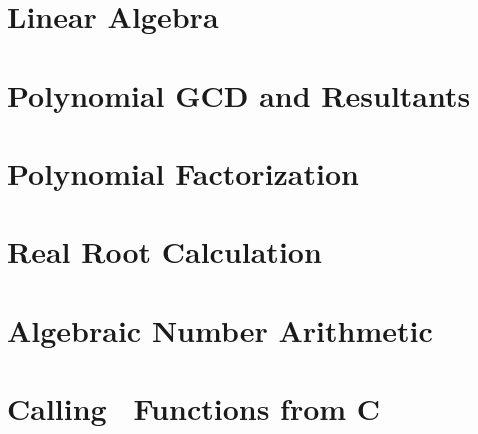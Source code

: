\documentclass{report}
\begin{document}



\chapter{Linear Algebra}
\label{c:LA}




\chapter{Polynomial GCD and Resultants}
\label{c:GCD}




\chapter{Polynomial Factorization}
\label{c:PF}




\chapter{Real Root Calculation}
\label{c:RRC}




\chapter{Algebraic Number Arithmetic}
\label{c:AN}




\appendix
\clearpage
\chapter{Calling \saclib\ Functions from C}
\label{c:CFC}
\end{document}
